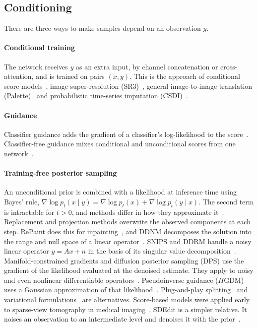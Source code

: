 \subsection{Conditioning}

There are three ways to make samples depend on an observation $y$.

\paragraph{Conditional training} The network receives $y$ as an extra input, by channel concatenation or cross-attention, and is trained on pairs $(x, y)$. This is the approach of conditional score models~\cite{batzolis2021conditional}, image super-resolution (SR3)~\cite{saharia2023sr3}, general image-to-image translation (Palette)~\cite{saharia2022palette} and probabilistic time-series imputation (CSDI)~\cite{tashiro2021csdi}.

\paragraph{Guidance} Classifier guidance adds the gradient of a classifier's log-likelihood to the score~\cite{dhariwal2021beat}. Classifier-free guidance mixes conditional and unconditional scores from one network~\cite{ho2022cfg}.

\paragraph{Training-free posterior sampling} An unconditional prior is combined with a likelihood at inference time using Bayes' rule, $\nabla \log p_t(x \mid y) = \nabla \log p_t(x) + \nabla \log p_t(y \mid x)$. The second term is intractable for $t>0$, and methods differ in how they approximate it~\cite{daras2024survey}. Replacement and projection methods overwrite the observed components at each step. RePaint does this for inpainting~\cite{lugmayr2022repaint}, and DDNM decomposes the solution into the range and null space of a linear operator~\cite{wang2023ddnm}. SNIPS and DDRM handle a noisy linear operator $y = Ax + n$ in the basis of its singular value decomposition~\cite{kawar2021snips,kawar2022ddrm}. Manifold-constrained gradients and diffusion posterior sampling (DPS) use the gradient of the likelihood evaluated at the denoised estimate. They apply to noisy and even nonlinear differentiable operators~\cite{chung2022mcg,chung2023dps}. Pseudoinverse guidance ($\Pi$GDM) uses a Gaussian approximation of that likelihood~\cite{song2023pigdm}. Plug-and-play splitting~\cite{zhu2023diffpir} and variational formulations~\cite{mardani2024reddiff} are alternatives. Score-based models were applied early to sparse-view tomography in medical imaging~\cite{song2022medical}. SDEdit is a simpler relative. It noises an observation to an intermediate level and denoises it with the prior~\cite{meng2022sdedit}.

